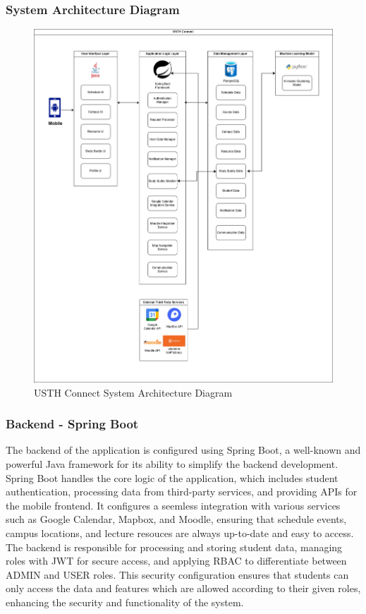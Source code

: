 \documentclass[12pt]{article}
\begin{document}
\subsubsection{System Architecture Diagram}
\begin{figure}[H]
    \centering
    \includegraphics[width=\textwidth]{image/USTH-Connect-System-Architecture-v1.pdf} 
    \caption{USTH Connect System Architecture Diagram}
\end{figure}

\pagebreak

\subsubsection{Backend - Spring Boot}
The backend of the application is configured using Spring Boot, a well-known and powerful Java framework for its ability to simplify the backend development.
Spring Boot handles the core logic of the application, which includes student authentication, processing data from third-party services, and providing APIs for the mobile frontend.
It configures a seemless integration with various services such as Google Calendar, Mapbox, and Moodle, ensuring that schedule events, campus locations, and lecture resouces are always up-to-date and easy to access.
The backend is responsible for processing and storing student data, managing roles with JWT for secure access, and applying RBAC to differentiate between ADMIN and USER roles.
This security configuration ensures that students can only access the data and features which are allowed according to their given roles, enhancing the security and functionality of the system.
\end{document}
